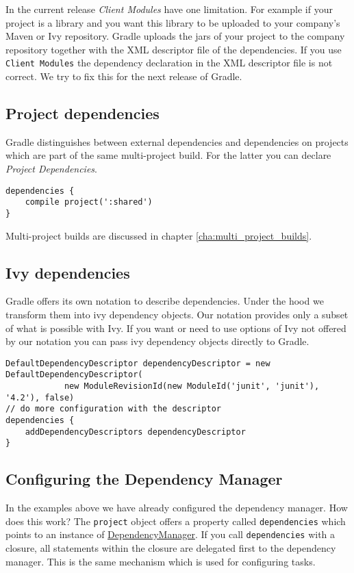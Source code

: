 In the current release \emph{Client Modules} have one limitation. For example if your project is a library and you want this library to be uploaded to your company's Maven or Ivy repository. Gradle uploads the jars of your project to the company repository together with the XML descriptor file of the dependencies. If you use \texttt{Client Modules} the dependency declaration in the XML descriptor file is not correct. We try to fix this for the next release of Gradle.

\subsection{Project dependencies} %
\label{sub:project_dependencies}
Gradle distinguishes between external dependencies and dependencies on projects which are part of the same multi-project build. For the latter you can declare \emph{Project Dependencies}.
\begin{Verbatim}
dependencies {
    compile project(':shared')
}	
\end{Verbatim}
Multi-project builds are discussed in chapter \ref{cha:multi_project_builds}.

\subsection{Ivy dependencies} %
\label{sub:ivy_dependencies}
Gradle offers its own notation to describe dependencies. Under the hood we transform them into ivy dependency objects. Our notation provides only a subset of what is possible with Ivy. If you want or need to use options of Ivy not offered by our notation you can pass ivy dependency objects directly to Gradle.
\begin{Verbatim}
DefaultDependencyDescriptor dependencyDescriptor = new DefaultDependencyDescriptor(
	        new ModuleRevisionId(new ModuleId('junit', 'junit'), '4.2'), false)
// do more configuration with the descriptor
dependencies {
	addDependencyDescriptors dependencyDescriptor 
}
\end{Verbatim}

\subsection{Configuring the Dependency Manager} %
\label{sub:configuring_the_dependency_manager}
In the examples above we have already configured the dependency manager. How does this work? The \texttt{project} object offers a property called \texttt{dependencies} which points to an instance of \href{\API DepencencyManager.html}{\PKG DependencyManager}. If you call \texttt{dependencies} with a closure, all statements within the closure are delegated first to the dependency manager. This is the same mechanism which is used for configuring tasks.

